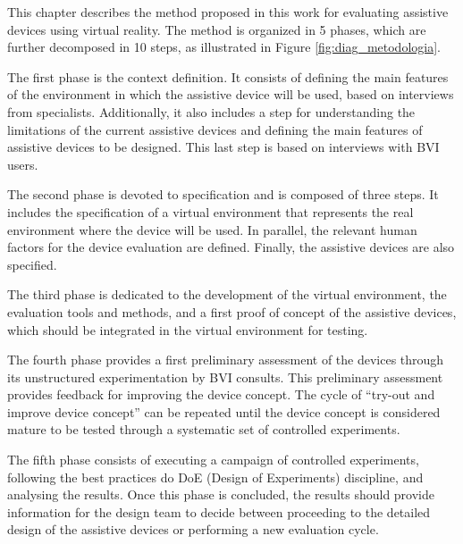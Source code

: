 


This chapter describes the method proposed in this work for evaluating assistive devices using virtual reality. The method is organized in 5 phases, which are further decomposed in 10 steps, as illustrated in Figure \ref{fig:diag_metodologia}.





The first phase is the context definition. It consists of defining the main features of the environment in which the assistive device will be used, based on interviews from specialists. Additionally, it also includes a step for understanding the limitations of the current assistive devices and defining the main features of assistive devices to be designed. This last step is based on interviews with BVI users.

The second phase is devoted to specification and is composed of three steps. It includes the specification of a virtual environment that represents the real environment where the device will be used. In parallel, the relevant human factors for the device evaluation are defined. Finally, the assistive devices are also specified.

The third phase is dedicated to the development of the virtual environment, the evaluation tools and methods, and a first proof of concept of the assistive devices, which should be integrated in the virtual environment for testing. 

The fourth phase provides a first preliminary assessment of the devices through its unstructured experimentation by BVI consults. This preliminary assessment provides feedback for improving the device concept. The cycle of “try-out and improve device concept” can be repeated until the device concept is considered mature to be tested through a systematic set of controlled experiments.

The fifth phase consists of executing a campaign of controlled experiments, following the best practices do DoE (Design of Experiments) discipline, and analysing the results. Once this phase is concluded, the results should provide information for the design team to decide between proceeding to the detailed design of the assistive devices or performing a new evaluation cycle. 

